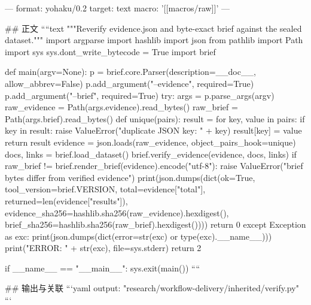 ---
format: yohaku/0.2
target: text
macro: '[[macros/raw]]'
---

## 正文
````text
"""Reverify evidence.json and byte-exact brief against the sealed dataset."""
import argparse
import hashlib
import json
from pathlib import Path
import sys
sys.dont_write_bytecode = True
import brief


def main(argv=None):
    p = brief.core.Parser(description=__doc__, allow_abbrev=False)
    p.add_argument("--evidence", required=True)
    p.add_argument("--brief", required=True)
    try:
        args = p.parse_args(argv)
        raw_evidence = Path(args.evidence).read_bytes()
        raw_brief = Path(args.brief).read_bytes()
        def unique(pairs):
            result = {}
            for key, value in pairs:
                if key in result:
                    raise ValueError("duplicate JSON key: " + key)
                result[key] = value
            return result
        evidence = json.loads(raw_evidence, object_pairs_hook=unique)
        docs, links = brief.load_dataset()
        brief.verify_evidence(evidence, docs, links)
        if raw_brief != brief.render_brief(evidence).encode("utf-8"):
            raise ValueError("brief bytes differ from verified evidence")
        print(json.dumps(dict(ok=True, tool_version=brief.VERSION, total=evidence["total"],
                              returned=len(evidence["results"]),
                              evidence_sha256=hashlib.sha256(raw_evidence).hexdigest(),
                              brief_sha256=hashlib.sha256(raw_brief).hexdigest())))
        return 0
    except Exception as exc:
        print(json.dumps(dict(error=str(exc) or type(exc).__name__)))
        print("ERROR: " + str(exc), file=sys.stderr)
        return 2


if __name__ == "__main__":
    sys.exit(main())
````

## 输出与关联
```yaml
output: "research/workflow-delivery/inherited/verify.py"
```
